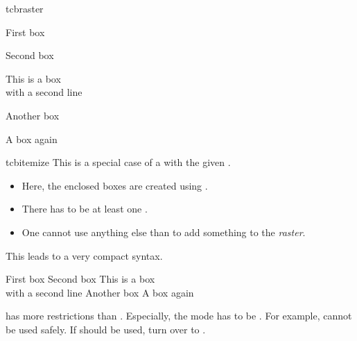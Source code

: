 \begin{docEnvironment}[doc new=2014-11-10]{tcbraster}{}
\begin{dispExample}
\begin{tcbraster}[raster columns=2, raster equal height=rows,
  size=small,colframe=red!50!black,colback=red!10!white,colbacktitle=red!50!white,
  title={Box \# \thetcbrasternum}]
  \begin{tcolorbox}First box\end{tcolorbox}
  \begin{tcolorbox}Second box\end{tcolorbox}
  \begin{tcolorbox}This is a box\\with a second line\end{tcolorbox}
  \begin{tcolorbox}Another box\end{tcolorbox}
  \begin{tcolorbox}A box again\end{tcolorbox}
\end{tcbraster}
\end{dispExample}
\end{docEnvironment}


\clearpage

\begin{docEnvironment}[doc new=2014-11-10]{tcbitemize}{}
This is a special case of a  with the given .
\begin{itemize}
\item Here, the enclosed boxes are created using .
\item There has to be at least one .
\item One cannot use anything else than  to add something
  to the \emph{raster}.
\end{itemize}
This leads to a very compact syntax.

\begin{dispExample}
\begin{tcbitemize}[raster columns=2, raster equal height=rows,
  size=small,colframe=red!50!black,colback=red!10!white,colbacktitle=red!50!white,
  title={Box \# \thetcbrasternum}]
  \tcbitem First box
  \tcbitem Second box
  \tcbitem This is a box\\with a second line
  \tcbitem[colback=yellow,colbacktitle=yellow!50!black] Another box
  \tcbitem A box again
\end{tcbitemize}
\end{dispExample}

\begin{marker}
 has more restrictions than .
Especially, the  mode has to be .
For example,  cannot be used safely.
If  should be used, turn over to .
\end{marker}
\end{docEnvironment}


